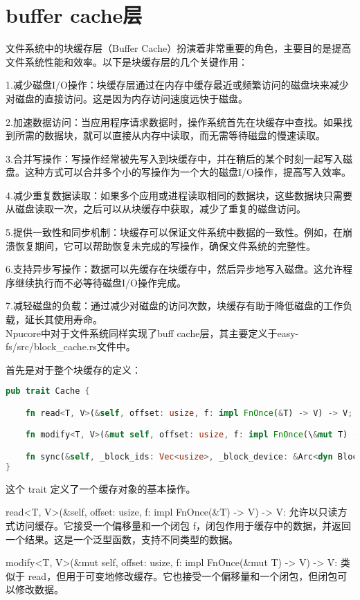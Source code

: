 \section{buffer cache层}
文件系统中的块缓存层（Buffer Cache）扮演着非常重要的角色，主要目的是提高文件系统性能和效率。以下是块缓存层的几个关键作用：

1.减少磁盘I/O操作：块缓存层通过在内存中缓存最近或频繁访问的磁盘块来减少对磁盘的直接访问。这是因为内存访问速度远快于磁盘。

2.加速数据访问：当应用程序请求数据时，操作系统首先在块缓存中查找。如果找到所需的数据块，就可以直接从内存中读取，而无需等待磁盘的慢速读取。

3.合并写操作：写操作经常被先写入到块缓存中，并在稍后的某个时刻一起写入磁盘。这种方式可以合并多个小的写操作为一个大的磁盘I/O操作，提高写入效率。

4.减少重复数据读取：如果多个应用或进程读取相同的数据块，这些数据块只需要从磁盘读取一次，之后可以从块缓存中获取，减少了重复的磁盘访问。

5.提供一致性和同步机制：块缓存可以保证文件系统中数据的一致性。例如，在崩溃恢复期间，它可以帮助恢复未完成的写操作，确保文件系统的完整性。

6.支持异步写操作：数据可以先缓存在块缓存中，然后异步地写入磁盘。这允许程序继续执行而不必等待磁盘I/O操作完成。

7.减轻磁盘的负载：通过减少对磁盘的访问次数，块缓存有助于降低磁盘的工作负载，延长其使用寿命。
\\[10pt]

Npucore中对于文件系统同样实现了buff cache层，其主要定义于easy-fs/src/block_cache.rs文件中。

首先是对于整个块缓存的定义：
\begin{lstlisting}[language={Rust},caption={Cache缓存对象基本操作}]
    pub trait Cache {

    fn read<T, V>(&self, offset: usize, f: impl FnOnce(&T) -> V) -> V;

    fn modify<T, V>(&mut self, offset: usize, f: impl FnOnce(\&mut T) -> V) -> V;

    fn sync(&self, _block_ids: Vec<usize>, _block_device: &Arc<dyn BlockDevice>) {}
}
\end{lstlisting}
这个 trait 定义了一个缓存对象的基本操作。

read<T, V>(\&self, offset: usize, f: impl FnOnce(\&T) -> V) -> V: 允许以只读方式访问缓存。它接受一个偏移量和一个闭包 f，闭包作用于缓存中的数据，并返回一个结果。这是一个泛型函数，支持不同类型的数据。

modify<T, V>(\&mut self, offset: usize, f: impl FnOnce(\&mut T) -> V) -> V: 类似于 read，但用于可变地修改缓存。它也接受一个偏移量和一个闭包，但闭包可以修改数据。


